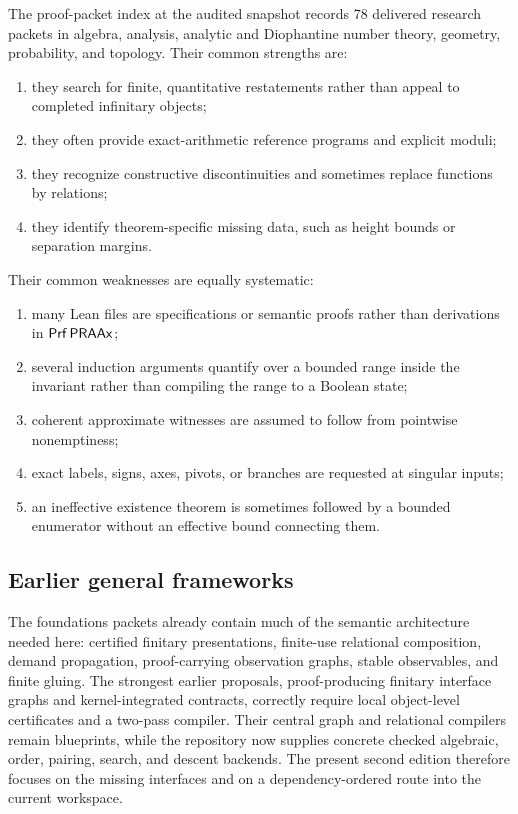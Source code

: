 The proof-packet index at the audited snapshot records 78 delivered research packets in algebra, analysis, analytic and Diophantine number theory, geometry, probability, and topology.  Their common strengths are:
\begin{enumerate}[label=(\arabic*)]
  \item they search for finite, quantitative restatements rather than appeal to completed infinitary objects;
  \item they often provide exact-arithmetic reference programs and explicit moduli;
  \item they recognize constructive discontinuities and sometimes replace functions by relations;
  \item they identify theorem-specific missing data, such as height bounds or separation margins.
\end{enumerate}
Their common weaknesses are equally systematic:
\begin{enumerate}[label=(\arabic*)]
  \item many Lean files are specifications or semantic proofs rather than derivations in \(\mathsf{Prf}\,\mathsf{PRAAx}\);
  \item several induction arguments quantify over a bounded range inside the invariant rather than compiling the range to a Boolean state;
  \item coherent approximate witnesses are assumed to follow from pointwise nonemptiness;
  \item exact labels, signs, axes, pivots, or branches are requested at singular inputs;
  \item an ineffective existence theorem is sometimes followed by a bounded enumerator without an effective bound connecting them.
\end{enumerate}

\subsection{Earlier general frameworks}

The foundations packets already contain much of the semantic architecture needed here: certified finitary presentations, finite-use relational composition, demand propagation, proof-carrying observation graphs, stable observables, and finite gluing.  The strongest earlier proposals, proof-producing finitary interface graphs and kernel-integrated contracts, correctly require local object-level certificates and a two-pass compiler.  Their central graph and relational compilers remain blueprints, while the repository now supplies concrete checked algebraic, order, pairing, search, and descent backends.  The present second edition therefore focuses on the missing interfaces and on a dependency-ordered route into the current workspace.

